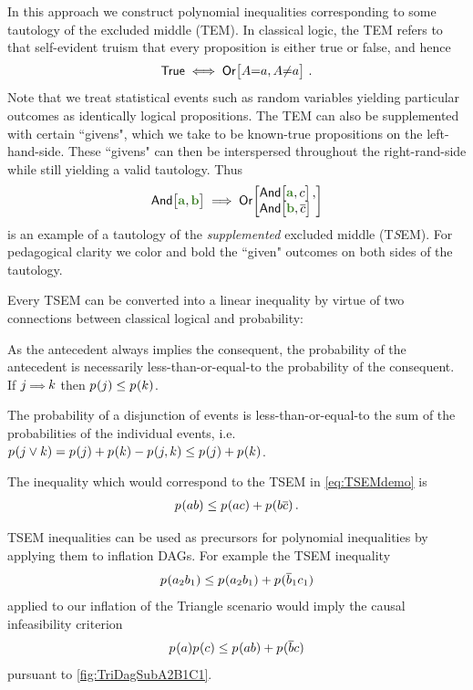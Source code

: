 In this approach we construct polynomial inequalities corresponding to some tautology of the excluded middle (TEM). In classical logic, the TEM refers to that self-evident truism that every proposition is either true or false, and hence 
\begin{align}
\mathsf{True} \iff \NamedFunction{Or}{ A\cramp{=}a , A\cramp{\neq}a }\,.
\end{align}
Note that we treat statistical events such as random variables yielding particular outcomes as identically logical propositions. The TEM can also be supplemented with certain ``givens", which we take to be known-true propositions on the left-hand-side. These ``givens" can then be interspersed throughout the right-rand-side while still yielding a valid tautology. Thus
\begin{align}\label{eq:TSEMdemo}
\NamedFunction{And}{ \mgreen{a} , \mgreen{b} }
\implies 
\NamedFunction{Or}{
    \NamedFunction{And}{ \mgreen{a} , c } ,\\
    \NamedFunction{And}{ \mgreen{b} , \n{c} }
}
\end{align}
is an example of a tautology of the \emph{supplemented} excluded middle (T\emph{S}EM). For pedagogical clarity we color and bold the ``given" outcomes on both sides of the tautology.

Every TSEM can be converted into a linear inequality by virtue of two connections between classical logical and probability:
\begin{compactenum}
\item As the antecedent always implies the consequent, the probability of the antecedent is necessarily less-than-or-equal-to the probability of the consequent. If $j \mathord{\scriptstyle \implies} k$ then ${p_{}}\lparen j\rparen\leq{p_{}}\lparen k\rparen$.
\item The probability of a disjunction of events is less-than-or-equal-to the sum of the probabilities of the individual events, i.e. ${{p_{}}\lparen j\lor k\rparen={p_{}}\lparen j\rparen+{p_{}}\lparen k\rparen-{p_{}}\lparen j,k\rparen\leq {p_{}}\lparen j\rparen+{p_{}}\lparen k\rparen}$.
\end{compactenum}
The inequality which would correspond to the TSEM in \cref{eq:TSEMdemo} is 
\begin{align}
    {p_{}}\lparen a b\rparen \leq {p_{}}\lparen a c\rparen+{p_{}}\lparen b \overline{c}\rparen\,.
\end{align}

TSEM inequalities can be used as precursors for polynomial inequalities by applying them to inflation DAGs. For example the TSEM inequality
\begin{align}
    {p_{}}\lparen a_2 b_1\rparen \leq {p_{}}\lparen a_2 b_1\rparen+{p_{}}\lparen\overline{b}_1 c_1\rparen
\end{align}
applied to our inflation of the Triangle scenario would imply the causal infeasibility criterion  
\begin{align}
    {p_{}}\lparen a\rparen{p_{}}\lparen c\rparen \leq {p_{}}\lparen a b\rparen+{p_{}}\lparen\overline{b} c\rparen
\end{align}
pursuant to \cref{fig:TriDagSubA2B1C1}.

